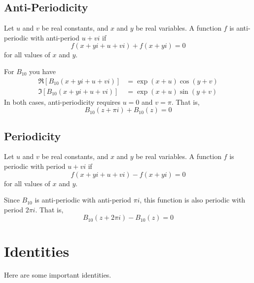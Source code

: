 \subsection{Anti-Periodicity}
Let $u$ and $v$ be real constants, and $x$ and $y$ be real variables. A function $f$ is anti-periodic with anti-period $u + v i $ if
\begin{equation}
    f(x + y i + u + v i) + f(x + y i) = 0
\end{equation}
for all values of $x$ and $y$.

For $B_{10}$ you have
\begin{align}
    \Re\left[ B_{10}(x + y i + u + v i) \right] &= \exp({x} + u) \cos(y + v) \\
    \Im\left[ B_{10}(x + y i + u + v i) \right] &= \exp({x} + u) \sin(y + v)
\end{align}
In both cases, anti-periodicity requires $u = 0$ and $v = \pi$. That is,
\begin{equation}
    B_{10}(z + \pi i) + B_{10}(z) = 0
\end{equation}
\subsection{Periodicity}
Let $u$ and $v$ be real constants, and $x$ and $y$ be real variables. A function $f$ is periodic with period $u + v i $ if
\begin{equation}
    f(x + y i + u + v i) - f(x + y i) = 0
\end{equation}
for all values of $x$ and $y$.

Since $B_{10}$ is anti-periodic with anti-period $\pi i$, this function is also periodic with period $2 \pi i$. That is,
\begin{equation}
    B_{10}(z + 2 \pi i) - B_{10}(z) = 0
\end{equation}
\section{Identities}
Here are some important identities.
